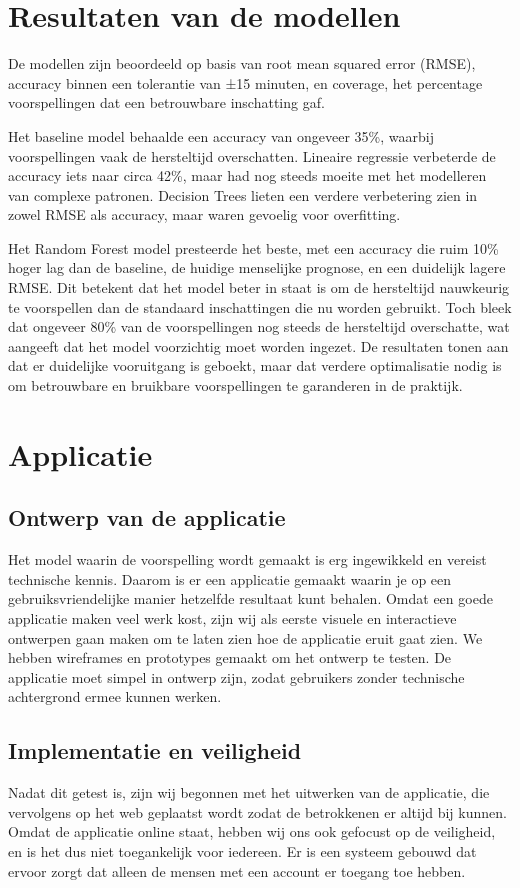 \documentclass{article}
\begin{document}
\section{Resultaten van de modellen}
De modellen zijn beoordeeld op basis van root mean squared error (RMSE), accuracy binnen een tolerantie van ±15 minuten, en coverage, het percentage voorspellingen dat een betrouwbare inschatting gaf.

Het baseline model behaalde een accuracy van ongeveer 35\%, waarbij voorspellingen vaak de hersteltijd overschatten. Lineaire regressie verbeterde de accuracy iets naar circa 42\%, maar had nog steeds moeite met het modelleren van complexe patronen. Decision Trees lieten een verdere verbetering zien in zowel RMSE als accuracy, maar waren gevoelig voor overfitting.

Het Random Forest model presteerde het beste, met een accuracy die ruim 10\% hoger lag dan de baseline, de huidige menselijke prognose, en een duidelijk lagere RMSE. Dit betekent dat het model beter in staat is om de hersteltijd nauwkeurig te voorspellen dan de standaard inschattingen die nu worden gebruikt. Toch bleek dat ongeveer 80\% van de voorspellingen nog steeds de hersteltijd overschatte, wat aangeeft dat het model voorzichtig moet worden ingezet. De resultaten tonen aan dat er duidelijke vooruitgang is geboekt, maar dat verdere optimalisatie nodig is om betrouwbare en bruikbare voorspellingen te garanderen in de praktijk.

\newpage
\section{Applicatie}

\subsection{Ontwerp van de applicatie}
Het model waarin de voorspelling wordt gemaakt is erg ingewikkeld en vereist technische kennis. Daarom is er een applicatie gemaakt waarin je op een gebruiksvriendelijke manier hetzelfde resultaat kunt behalen. Omdat een goede applicatie maken veel werk kost, zijn wij als eerste visuele en interactieve ontwerpen gaan maken om te laten zien hoe de applicatie eruit gaat zien. We hebben wireframes en prototypes gemaakt om het ontwerp te testen. De applicatie moet simpel in ontwerp zijn, zodat gebruikers zonder technische achtergrond ermee kunnen werken.

\subsection{Implementatie en veiligheid}
Nadat dit getest is, zijn wij begonnen met het uitwerken van de applicatie, die vervolgens op het web geplaatst wordt zodat de betrokkenen er altijd bij kunnen. Omdat de applicatie online staat, hebben wij ons ook gefocust op de veiligheid, en is het dus niet toegankelijk voor iedereen. Er is een systeem gebouwd dat ervoor zorgt dat alleen de mensen met een account er toegang toe hebben.
\end{document}
